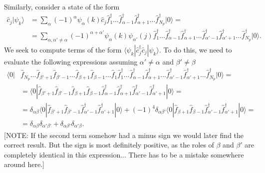 \documentclass[english, parskip=full]{scrartcl}
\renewcommand{\braket}{}
\newcommand{\Ket}{}
\begin{document}
Similarly, consider a state of the form
\begin{align}
\hat{c}_j \Ket | \psi_k \rangle &= \sum_\alpha (-1)^\alpha \psi_\alpha(k) \hat{c}_j \hat{f}_1^\dagger \dots \hat{f}_{\alpha-1}^\dagger \hat{f}_{\alpha+1}^\dagger \dots \hat{f}_{N_p}^\dagger \Ket | 0 \rangle = \\
&= \sum_{\alpha, \alpha'\neq \alpha} (-1)^{\alpha + \alpha'} \psi_\alpha(k) \psi_{\alpha'}(j) \hat{f}_1^\dagger \dots \hat{f}_{\alpha-1}^\dagger \hat{f}_{\alpha+1}^\dagger \dots \hat{f}_{\alpha' -1}^\dagger \hat{f}_{\alpha' +1}^\dagger \dots \hat{f}_{N_p}^\dagger \Ket | 0 \rangle.
\end{align}
We seek to compute terms of the form $\braket\langle \psi_k | \hat{c}_j^\dagger \hat{c}_j | \psi_k \rangle$.
To do this, we need to evaluate the following expressions assuming $\alpha'\neq \alpha$ and $\beta'\neq \beta$
\begin{align}
\braket\langle 0 | &\hat{f}_{N_p} \dots \hat{f}_{\beta'+1} \hat{f}_{\beta'-1} \dots \hat{f}_{\beta+1} \hat{f}_{\beta-1} \dots \hat{f}_1 \hat{f}_1^\dagger \dots \hat{f}_{\alpha-1}^\dagger \hat{f}_{\alpha+1}^\dagger \dots \hat{f}_{\alpha' -1}^\dagger \hat{f}_{\alpha' +1}^\dagger \dots \hat{f}_{N_p}^\dagger | 0 \rangle = \\
&= \braket\langle 0 | \hat{f}_{\beta'+1} \hat{f}_{\beta'-1} \hat{f}_{\beta+1} \hat{f}_{\beta-1} \hat{f}_{\alpha-1}^\dagger \hat{f}_{\alpha+1}^\dagger \hat{f}_{\alpha' -1}^\dagger \hat{f}_{\alpha' +1}^\dagger | 0 \rangle = \\
&= \delta_{\alpha\beta} \braket\langle 0 | \hat{f}_{\beta'+1} \hat{f}_{\beta'-1} \hat{f}_{\alpha' -1}^\dagger \hat{f}_{\alpha' +1}^\dagger | 0 \rangle + (-1)^4 \delta_{\alpha \beta'} \braket\langle 0 | \hat{f}_{\beta+1} \hat{f}_{\beta-1} \hat{f}_{\alpha' -1}^\dagger \hat{f}_{\alpha' +1}^\dagger | 0 \rangle = \\
&= \delta_{\alpha\beta} \delta_{\alpha'\beta'} + \delta_{\alpha\beta'} \delta_{\alpha'\beta}.
\end{align}
[NOTE: If the second term somehow had a minus sign we would later find the correct result. But the sign is most definitely positive, as the roles of $\beta$ and $\beta'$ are completely identical in this expression... There has to be a mistake somewhere around here.]\\
\end{document}

